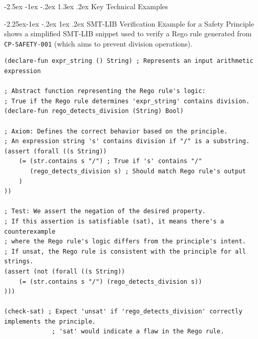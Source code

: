 \documentclass[manuscript,screen,review,anonymous,9pt]{acmart}
\makeatletter
\renewcommand\section{\@startsection{section}{1}{\z@}%
  {-2.5ex \@plus -1ex \@minus -.2ex}%
  {1.3ex \@plus.2ex}%
  {\normalfont\Large\bfseries}}
\renewcommand\subsection{\@startsection{subsection}{2}{\z@}%
  {-2.25ex\@plus -1ex \@minus -.2ex}%
  {1ex \@plus .2ex}%
  {\normalfont\large\bfseries}}
\makeatother
\begin{document}
\section{Key Technical Examples}
\label{app:key_examples}

\subsection{SMT-LIB Verification Example for a Safety Principle}
 shows a simplified SMT-LIB snippet used to verify a Rego rule generated from \texttt{CP-SAFETY-001} (which aims to prevent division operations).
\begin{lstlisting}[language=SMTLIB, caption={SMT-LIB example for CP-SAFETY-001 verification. This code checks if a Rego rule (represented by `rego_detects_division`) correctly identifies expressions containing a division operator ('/').}, label=lst:smtlib_example, basicstyle=\ttfamily\footnotesize]
(declare-fun expr_string () String) ; Represents an input arithmetic expression

; Abstract function representing the Rego rule's logic:
; True if the Rego rule determines 'expr_string' contains division.
(declare-fun rego_detects_division (String) Bool)

; Axiom: Defines the correct behavior based on the principle.
; An expression string 's' contains division if "/" is a substring.
(assert (forall ((s String))
    (= (str.contains s "/") ; True if 's' contains "/"
       (rego_detects_division s) ; Should match Rego rule's output
    )
))

; Test: We assert the negation of the desired property.
; If this assertion is satisfiable (sat), it means there's a counterexample
; where the Rego rule's logic differs from the principle's intent.
; If unsat, the Rego rule is consistent with the principle for all strings.
(assert (not (forall ((s String))
    (= (str.contains s "/") (rego_detects_division s))
)))

(check-sat) ; Expect 'unsat' if 'rego_detects_division' correctly implements the principle.
             ; 'sat' would indicate a flaw in the Rego rule.
\end{lstlisting}
\end{document}
